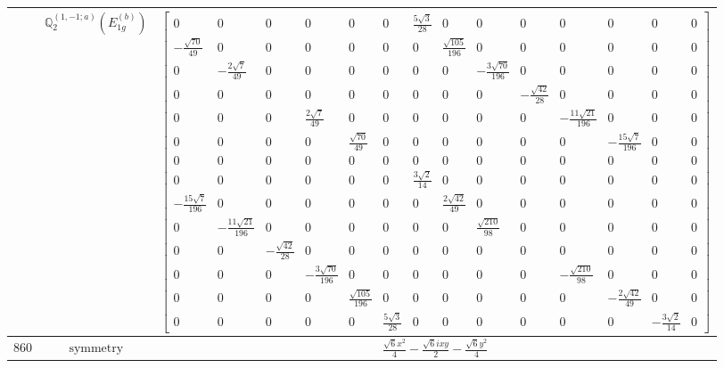 \documentclass[fleqn,8pt,landscape]{jsarticle}
\begin{document}
\begin{longtable}{ccc}
$  $ & $ \mathbb{Q}_{2}^{(1,-1;a)}(E_{1g}^{(b)}) $ & $ \begin{bmatrix} 0 & 0 & 0 & 0 & 0 & 0 & \frac{5 \sqrt{3}}{28} & 0 & 0 & 0 & 0 & 0 & 0 & 0 \\ - \frac{\sqrt{70}}{49} & 0 & 0 & 0 & 0 & 0 & 0 & \frac{\sqrt{105}}{196} & 0 & 0 & 0 & 0 & 0 & 0 \\ 0 & - \frac{2 \sqrt{7}}{49} & 0 & 0 & 0 & 0 & 0 & 0 & - \frac{3 \sqrt{70}}{196} & 0 & 0 & 0 & 0 & 0 \\ 0 & 0 & 0 & 0 & 0 & 0 & 0 & 0 & 0 & - \frac{\sqrt{42}}{28} & 0 & 0 & 0 & 0 \\ 0 & 0 & 0 & \frac{2 \sqrt{7}}{49} & 0 & 0 & 0 & 0 & 0 & 0 & - \frac{11 \sqrt{21}}{196} & 0 & 0 & 0 \\ 0 & 0 & 0 & 0 & \frac{\sqrt{70}}{49} & 0 & 0 & 0 & 0 & 0 & 0 & - \frac{15 \sqrt{7}}{196} & 0 & 0 \\ 0 & 0 & 0 & 0 & 0 & 0 & 0 & 0 & 0 & 0 & 0 & 0 & 0 & 0 \\ 0 & 0 & 0 & 0 & 0 & 0 & \frac{3 \sqrt{2}}{14} & 0 & 0 & 0 & 0 & 0 & 0 & 0 \\ - \frac{15 \sqrt{7}}{196} & 0 & 0 & 0 & 0 & 0 & 0 & \frac{2 \sqrt{42}}{49} & 0 & 0 & 0 & 0 & 0 & 0 \\ 0 & - \frac{11 \sqrt{21}}{196} & 0 & 0 & 0 & 0 & 0 & 0 & \frac{\sqrt{210}}{98} & 0 & 0 & 0 & 0 & 0 \\ 0 & 0 & - \frac{\sqrt{42}}{28} & 0 & 0 & 0 & 0 & 0 & 0 & 0 & 0 & 0 & 0 & 0 \\ 0 & 0 & 0 & - \frac{3 \sqrt{70}}{196} & 0 & 0 & 0 & 0 & 0 & 0 & - \frac{\sqrt{210}}{98} & 0 & 0 & 0 \\ 0 & 0 & 0 & 0 & \frac{\sqrt{105}}{196} & 0 & 0 & 0 & 0 & 0 & 0 & - \frac{2 \sqrt{42}}{49} & 0 & 0 \\ 0 & 0 & 0 & 0 & 0 & \frac{5 \sqrt{3}}{28} & 0 & 0 & 0 & 0 & 0 & 0 & - \frac{3 \sqrt{2}}{14} & 0 \end{bmatrix} $ \\ \hline
$ 860 $ & $ \text{symmetry} $ & $ \frac{\sqrt{6} x^{2}}{4} - \frac{\sqrt{6} i x y}{2} - \frac{\sqrt{6} y^{2}}{4} $ \\

\end{longtable}
\end{document}
